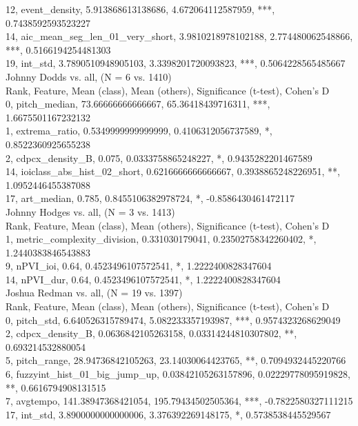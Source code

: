 12, event_density, 5.913868613138686, 4.672064112587959, ***, 0.7438592593523227\\
14, aic_mean_seg_len_01_very_short, 3.9810218978102188, 2.774480062548866, ***, 0.5166194254481303\\
19, int_std, 3.7890510948905103, 3.3398201720093823, ***, 0.5064228565485667\\
Johnny Dodds vs. all, (N = 6 vs. 1410)\\
Rank, Feature, Mean (class), Mean (others), Significance (t-test), Cohen's D\\
0, pitch_median, 73.66666666666667, 65.36418439716311, ***, 1.6675501167232132\\
1, extrema_ratio, 0.5349999999999999, 0.4106312056737589, *, 0.8522360925655238\\
2, cdpcx_density_B, 0.075, 0.0333758865248227, *, 0.9435282201467589\\
14, ioiclass_abs_hist_02_short, 0.6216666666666667, 0.3938865248226951, **, 1.0952446455387088\\
17, art_median, 0.785, 0.8455106382978724, *, -0.8586430461472117\\
Johnny Hodges vs. all, (N = 3 vs. 1413)\\
Rank, Feature, Mean (class), Mean (others), Significance (t-test), Cohen's D\\
1, metric_complexity_division, 0.331030179041, 0.23502758342260402, *, 1.2440383846543883\\
9, nPVI_ioi, 0.64, 0.4523496107572541, *, 1.2222400828347604\\
14, nPVI_dur, 0.64, 0.4523496107572541, *, 1.2222400828347604\\
Joshua Redman vs. all, (N = 19 vs. 1397)\\
Rank, Feature, Mean (class), Mean (others), Significance (t-test), Cohen's D\\
0, pitch_std, 6.640526315789474, 5.082233357193987, ***, 0.9574323268629049\\
2, cdpcx_density_B, 0.0636842105263158, 0.03314244810307802, **, 0.693214532880054\\
5, pitch_range, 28.94736842105263, 23.14030064423765, **, 0.7094932445220766\\
6, fuzzyint_hist_01_big_jump_up, 0.03842105263157896, 0.02229778095919828, **, 0.6616794908131515\\
7, avgtempo, 141.38947368421054, 195.79434502505364, ***, -0.7822580327111215\\
17, int_std, 3.8900000000000006, 3.376392269148175, *, 0.5738538445529567\\
